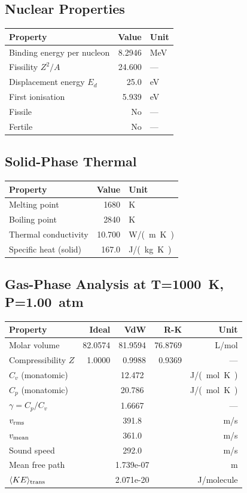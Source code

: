 \documentclass[11pt,a4paper]{article}
\begin{document}
\subsection{Nuclear Properties}
\begin{tabular}{lrl}
  \toprule
  Property & Value & Unit \\
  \midrule
  Binding energy per nucleon & 8.2946 & \si{MeV} \\
  Fissility $Z^2/A$ & 24.600 & --- \\
  Displacement energy $E_d$ & 25.0 & \si{eV} \\
  First ionisation & 5.939 & \si{eV} \\
  Fissile & No & --- \\
  Fertile & No & --- \\
  \bottomrule
\end{tabular}

\subsection{Solid-Phase Thermal}
\begin{tabular}{lrl}
  \toprule
  Property & Value & Unit \\
  \midrule
  Melting point & 1680 & \si{K} \\
  Boiling point & 2840 & \si{K} \\
  Thermal conductivity & 10.700 & \si{W/(m.K)} \\
  Specific heat (solid) & 167.0 & \si{J/(kg.K)} \\
  \bottomrule
\end{tabular}

\subsection{Gas-Phase Analysis at T=\SI{1000}{K}, P=\SI{1.00}{atm}}
\begin{tabular}{lrrrr}
  \toprule
  Property & Ideal & VdW & R-K & Unit \\
  \midrule
  Molar volume & 82.0574 & 81.9594 & 76.8769 & \si{L/mol} \\
  Compressibility $Z$ & 1.0000 & 0.9988 & 0.9369 & --- \\
  \midrule
  $C_v$ (monatomic) & \multicolumn{3}{c}{12.472} & \si{J/(mol.K)} \\
  $C_p$ (monatomic) & \multicolumn{3}{c}{20.786} & \si{J/(mol.K)} \\
  $\gamma = C_p/C_v$ & \multicolumn{3}{c}{1.6667} & --- \\
  $v_{\rm rms}$ & \multicolumn{3}{c}{391.8} & \si{m/s} \\
  $v_{\rm mean}$ & \multicolumn{3}{c}{361.0} & \si{m/s} \\
  Sound speed & \multicolumn{3}{c}{292.0} & \si{m/s} \\
  Mean free path & \multicolumn{3}{c}{1.739e-07} & \si{m} \\
  $\langle KE \rangle_{\rm trans}$ & \multicolumn{3}{c}{2.071e-20} & \si{J/molecule} \\
  \bottomrule
\end{tabular}
\end{document}
